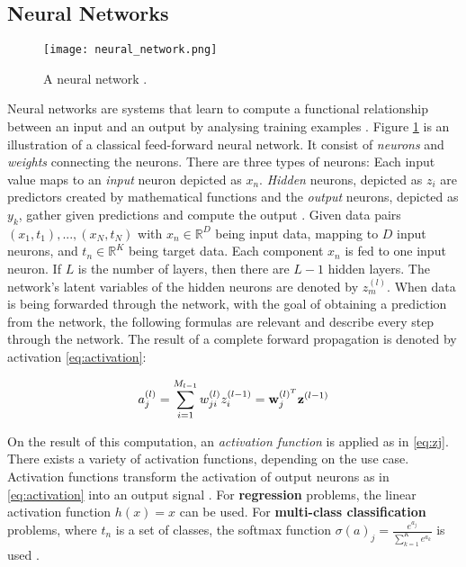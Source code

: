 \subsection{Neural Networks \label{sec:neural-networks}}
\begin{figure}[h]
  \centering
  \texttt{[image: neural\_network.png]}\\
  \caption{A neural network \cite{hallmachinelearning}.}
  \label{fig:neural_network}
\end{figure}
Neural networks are systems that learn to compute a functional relationship between an input and an output by analysing training examples \cite{sibi2013analysis}. Figure \ref{fig:neural_network} is an illustration of a classical feed-forward neural network. It consist of \textit{neurons} and \textit{weights} connecting the neurons. There are three types of neurons: Each input value maps to an \textit{input} neuron depicted as $x_n$. \textit{Hidden} neurons, depicted as $z_i$ are predictors created by mathematical functions and the \textit{output} neurons, depicted as $y_k$, gather given predictions and compute the output \cite{hallmachinelearning}. Given data pairs $(x_1, t_1), ..., (x_N, t_N)$ with $x_n \in \mathbb{R}^D$ being input data, mapping to $D$ input neurons, and $t_n \in \mathbb{R}^K$ being target data. Each component $x_n$ is fed to one input neuron. If $L$ is the number of layers, then there are $L-1$ hidden layers. The network's latent variables of the hidden neurons are denoted by $z_m^{(l)}$. When data is being forwarded through the network, with the goal of obtaining a prediction from the network, the following formulas are relevant and describe every step through the network. The result of a complete forward propagation is denoted by activation \ref{eq:activation}:

\begin{equation}\label{eq:activation}
	a_j^{(l)} = \sum_{i=1}^{M_{l-1}}w_{ji}^{(l)}z_i^{(l-1)} = \bold{w}_j^{(l)^T} \bold{z}^{(l-1)}	
\end{equation}

On the result of this computation, an \textit{activation function} is applied as in \ref{eq:zj}. There exists a variety of activation functions, depending on the use case. Activation functions transform the activation of output neurons as in \ref{eq:activation} into an output signal \cite{sibi2013analysis}. For \textbf{regression} problems, the linear activation function $h(x)=x$ can be used. For \textbf{multi-class classification} problems, where $t_n$ is a set of classes, the softmax function $\sigma(a)_j= \frac{e^{a_j}}{\sum_{k=1}^Ke^{a_k}}$ is used \cite{hallmachinelearning}.

